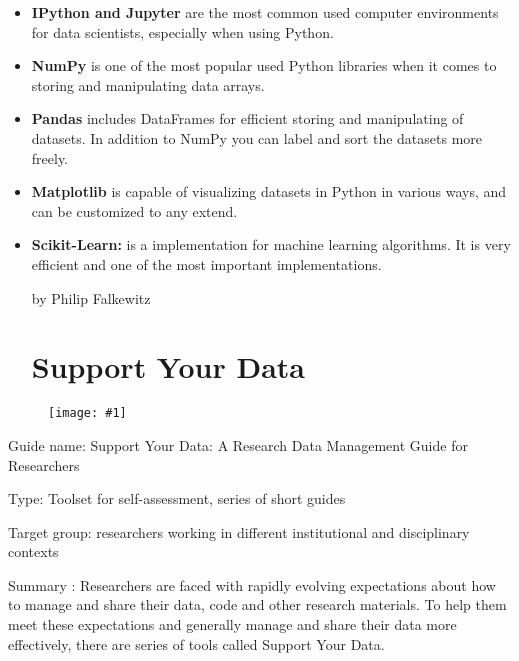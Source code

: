 \documentclass{article}
\newlength{\imgwidth}
\newcommand\scaledgraphics[2]{%
                
\settowidth{\imgwidth}{\texttt{[image: \#1]}}%
                
\setlength{\imgwidth}{\minof{\imgwidth}{#2\textwidth}}%
                
\texttt{[image: \#1]}%
                
}
\begin{document}
\begin{itemize}
\item \textbf{IPython and Jupyter} are the most common used computer environments for data scientists, especially when using Python.


\item \textbf{NumPy }is one of the most popular used Python libraries when it comes to storing and manipulating data arrays.


\item \textbf{Pandas }includes DataFrames for efficient storing and manipulating of datasets. In addition to NumPy you can label and sort the datasets more freely.


\item \textbf{Matplotlib }is capable of visualizing datasets in Python in various ways, and can be customized to any extend.


\item \textbf{Scikit-Learn: }is a implementation for machine learning algorithms. It is very efficient and one of the most important implementations.





by Philip Falkewitz





\section{Support Your Data}\label{H2541051}



\end{itemize}

\begin{center}
\begin{figure}
\scaledgraphics{45bdf5de-7e5b-448d-820a-d3b3288a4dbe.png}{0.5}
\label{F88206441}
\end{figure}


\end{center}


Guide name: Support Your Data: A Research Data Management Guide for Researchers \autocite{borghi_support_2018}


Type: Toolset for self-assessment, series of short guides


Target group: researchers working in different institutional and disciplinary contexts


Summary : Researchers are faced with rapidly evolving expectations about how to manage and share their data, code and other research materials. To help them meet these expectations and generally manage and share their data more effectively, there are series of tools called Support Your Data.
\end{document}

